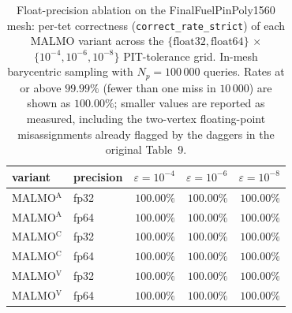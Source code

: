 \begin{table}[t]
\centering\small
\caption{Float-precision ablation on the FinalFuelPinPoly1560 mesh: per-tet correctness (\texttt{correct\_rate\_strict}) of each MALMO variant across the $\{\text{float32}, \text{float64}\}$ $\times$ $\{10^{-4}, 10^{-6}, 10^{-8}\}$ PIT-tolerance grid.  In-mesh barycentric sampling with $N_p = 100\,000$ queries.  Rates at or above $99.99\%$ (fewer than one miss in $10\,000$) are shown as $100.00\%$; smaller values are reported as measured, including the two-vertex floating-point misassignments already flagged by the daggers in the original Table~9.}
\label{tab:r1g-float-FinalFuelPinPoly1560}
\begin{tabular}{llrrr}
\toprule
variant & precision & $\varepsilon{=}10^{-4}$ & $\varepsilon{=}10^{-6}$ & $\varepsilon{=}10^{-8}$ \\
\midrule
MALMO$^{\mathrm{A}}$ & fp32 & $100.00\%$ & $100.00\%$ & $100.00\%$ \\
MALMO$^{\mathrm{A}}$ & fp64 & $100.00\%$ & $100.00\%$ & $100.00\%$ \\
\midrule
MALMO$^{\mathrm{C}}$ & fp32 & $100.00\%$ & $100.00\%$ & $100.00\%$ \\
MALMO$^{\mathrm{C}}$ & fp64 & $100.00\%$ & $100.00\%$ & $100.00\%$ \\
\midrule
MALMO$^{\mathrm{V}}$ & fp32 & $100.00\%$ & $100.00\%$ & $100.00\%$ \\
MALMO$^{\mathrm{V}}$ & fp64 & $100.00\%$ & $100.00\%$ & $100.00\%$ \\
\bottomrule
\end{tabular}
\end{table}
